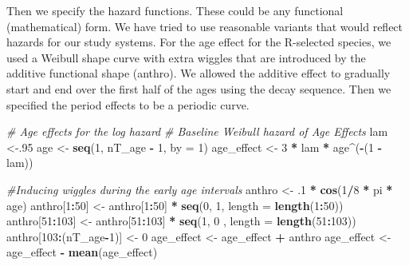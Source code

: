 \documentclass[11pt,]{article}
\newenvironment{Shaded}{\begin{snugshade}}{\end{snugshade}}
\newcommand{\KeywordTok}[1]{\textcolor[rgb]{0.13,0.29,0.53}{\textbf{#1}}}
\newcommand{\DataTypeTok}[1]{\textcolor[rgb]{0.13,0.29,0.53}{#1}}
\newcommand{\DecValTok}[1]{\textcolor[rgb]{0.00,0.00,0.81}{#1}}
\newcommand{\StringTok}[1]{\textcolor[rgb]{0.31,0.60,0.02}{#1}}
\newcommand{\CommentTok}[1]{\textcolor[rgb]{0.56,0.35,0.01}{\textit{#1}}}
\newcommand{\OperatorTok}[1]{\textcolor[rgb]{0.81,0.36,0.00}{\textbf{#1}}}
\newcommand{\NormalTok}[1]{#1}
\begin{document}
Then we specify the hazard functions. These could be any functional
(mathematical) form. We have tried to use reasonable variants that would
reflect hazards for our study systems. For the age effect for the
R-selected species, we used a Weibull shape curve with extra wiggles
that are introduced by the additive functional shape (anthro). We
allowed the additive effect to gradually start and end over the first
half of the ages using the decay sequence. Then we specified the period
effects to be a periodic curve.

\begin{Shaded}
\begin{Highlighting}[]
  \CommentTok{# Age effects for the log hazard}
  \CommentTok{# Baseline Weibull hazard of Age Effects}
\NormalTok{  lam <-.}\DecValTok{95}
\NormalTok{  age <-}\StringTok{ }\KeywordTok{seq}\NormalTok{(}\DecValTok{1}\NormalTok{, nT_age }\OperatorTok{-}\StringTok{ }\DecValTok{1}\NormalTok{, }\DataTypeTok{by =} \DecValTok{1}\NormalTok{) }
\NormalTok{  age_effect <-}\StringTok{ }\DecValTok{3} \OperatorTok{*}\StringTok{ }\NormalTok{lam }\OperatorTok{*}\StringTok{ }\NormalTok{age}\OperatorTok{^}\NormalTok{(}\OperatorTok{-}\NormalTok{(}\DecValTok{1} \OperatorTok{-}\StringTok{ }\NormalTok{lam))}

  \CommentTok{#Inducing wiggles during the early age intervals}
\NormalTok{  anthro <-}\StringTok{ }\NormalTok{.}\DecValTok{1} \OperatorTok{*}\StringTok{ }\KeywordTok{cos}\NormalTok{(}\DecValTok{1}\OperatorTok{/}\DecValTok{8} \OperatorTok{*}\StringTok{ }\NormalTok{pi }\OperatorTok{*}\StringTok{ }\NormalTok{age)}
\NormalTok{  anthro[}\DecValTok{1}\OperatorTok{:}\DecValTok{50}\NormalTok{] <-}\StringTok{ }\NormalTok{anthro[}\DecValTok{1}\OperatorTok{:}\DecValTok{50}\NormalTok{] }\OperatorTok{*}\StringTok{ }\KeywordTok{seq}\NormalTok{(}\DecValTok{0}\NormalTok{, }\DecValTok{1}\NormalTok{, }\DataTypeTok{length =} \KeywordTok{length}\NormalTok{(}\DecValTok{1}\OperatorTok{:}\DecValTok{50}\NormalTok{))}
\NormalTok{  anthro[}\DecValTok{51}\OperatorTok{:}\DecValTok{103}\NormalTok{] <-}\StringTok{ }\NormalTok{anthro[}\DecValTok{51}\OperatorTok{:}\DecValTok{103}\NormalTok{] }\OperatorTok{*}\StringTok{ }\KeywordTok{seq}\NormalTok{(}\DecValTok{1}\NormalTok{, }\DecValTok{0}\NormalTok{ , }\DataTypeTok{length =} \KeywordTok{length}\NormalTok{(}\DecValTok{51}\OperatorTok{:}\DecValTok{103}\NormalTok{))}
\NormalTok{  anthro[}\DecValTok{103}\OperatorTok{:}\NormalTok{(nT_age}\OperatorTok{-}\DecValTok{1}\NormalTok{)] <-}\StringTok{ }\DecValTok{0}
\NormalTok{  age_effect <-}\StringTok{ }\NormalTok{age_effect }\OperatorTok{+}\StringTok{ }\NormalTok{anthro}
\NormalTok{  age_effect <-}\StringTok{ }\NormalTok{age_effect }\OperatorTok{-}\StringTok{ }\KeywordTok{mean}\NormalTok{(age_effect)}
  

\end{Highlighting}
\end{Shaded}
\end{document}
